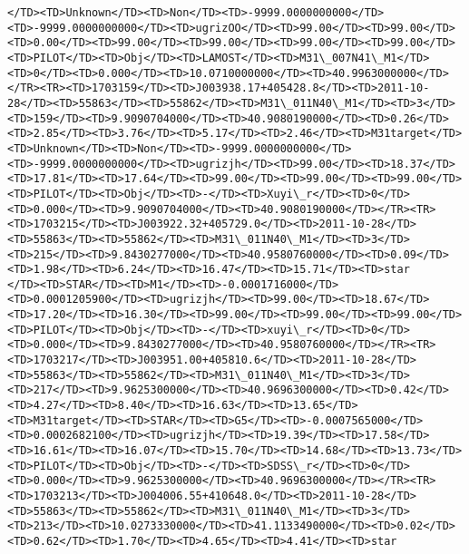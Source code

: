 \documentclass[11pt]{article}
\begin{document}
\begin{Verbatim}[commandchars=\\\{\}]
</TD><TD>Unknown</TD><TD>Non</TD><TD>-9999.0000000000</TD><TD>-9999.0000000000</TD><TD>ugrizOO</TD><TD>99.00</TD><TD>99.00</TD><TD>0.00</TD><TD>99.00</TD><TD>99.00</TD><TD>99.00</TD><TD>99.00</TD><TD>PILOT</TD><TD>Obj</TD><TD>LAMOST</TD><TD>M31\_007N41\_M1</TD><TD>0</TD><TD>0.000</TD><TD>10.0710000000</TD><TD>40.9963000000</TD></TR><TR><TD>1703159</TD><TD>J003938.17+405428.8</TD><TD>2011-10-28</TD><TD>55863</TD><TD>55862</TD><TD>M31\_011N40\_M1</TD><TD>3</TD><TD>159</TD><TD>9.9090704000</TD><TD>40.9080190000</TD><TD>0.26</TD><TD>2.85</TD><TD>3.76</TD><TD>5.17</TD><TD>2.46</TD><TD>M31target</TD><TD>Unknown</TD><TD>Non</TD><TD>-9999.0000000000</TD><TD>-9999.0000000000</TD><TD>ugrizjh</TD><TD>99.00</TD><TD>18.37</TD><TD>17.81</TD><TD>17.64</TD><TD>99.00</TD><TD>99.00</TD><TD>99.00</TD><TD>PILOT</TD><TD>Obj</TD><TD>-</TD><TD>Xuyi\_r</TD><TD>0</TD><TD>0.000</TD><TD>9.9090704000</TD><TD>40.9080190000</TD></TR><TR><TD>1703215</TD><TD>J003922.32+405729.0</TD><TD>2011-10-28</TD><TD>55863</TD><TD>55862</TD><TD>M31\_011N40\_M1</TD><TD>3</TD><TD>215</TD><TD>9.8430277000</TD><TD>40.9580760000</TD><TD>0.09</TD><TD>1.98</TD><TD>6.24</TD><TD>16.47</TD><TD>15.71</TD><TD>star     </TD><TD>STAR</TD><TD>M1</TD><TD>-0.0001716000</TD><TD>0.0001205900</TD><TD>ugrizjh</TD><TD>99.00</TD><TD>18.67</TD><TD>17.20</TD><TD>16.30</TD><TD>99.00</TD><TD>99.00</TD><TD>99.00</TD><TD>PILOT</TD><TD>Obj</TD><TD>-</TD><TD>xuyi\_r</TD><TD>0</TD><TD>0.000</TD><TD>9.8430277000</TD><TD>40.9580760000</TD></TR><TR><TD>1703217</TD><TD>J003951.00+405810.6</TD><TD>2011-10-28</TD><TD>55863</TD><TD>55862</TD><TD>M31\_011N40\_M1</TD><TD>3</TD><TD>217</TD><TD>9.9625300000</TD><TD>40.9696300000</TD><TD>0.42</TD><TD>4.27</TD><TD>8.40</TD><TD>16.63</TD><TD>13.65</TD><TD>M31target</TD><TD>STAR</TD><TD>G5</TD><TD>-0.0007565000</TD><TD>0.0002682100</TD><TD>ugrizjh</TD><TD>19.39</TD><TD>17.58</TD><TD>16.61</TD><TD>16.07</TD><TD>15.70</TD><TD>14.68</TD><TD>13.73</TD><TD>PILOT</TD><TD>Obj</TD><TD>-</TD><TD>SDSS\_r</TD><TD>0</TD><TD>0.000</TD><TD>9.9625300000</TD><TD>40.9696300000</TD></TR><TR><TD>1703213</TD><TD>J004006.55+410648.0</TD><TD>2011-10-28</TD><TD>55863</TD><TD>55862</TD><TD>M31\_011N40\_M1</TD><TD>3</TD><TD>213</TD><TD>10.0273330000</TD><TD>41.1133490000</TD><TD>0.02</TD><TD>0.62</TD><TD>1.70</TD><TD>4.65</TD><TD>4.41</TD><TD>star     
\end{Verbatim}
\end{document}
